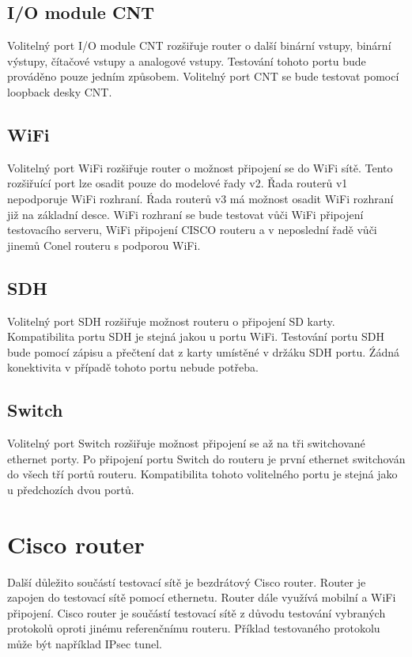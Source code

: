 \subsection{I/O module CNT}
Volitelný port I/O module CNT rozšiřuje router o další binární vstupy, binární výstupy, čítačové vstupy a analogové vstupy. Testování tohoto portu bude prováděno pouze jedním způsobem. Volitelný port CNT se bude testovat pomocí loopback desky CNT.

\subsection{WiFi}
Volitelný port WiFi rozšiřuje router o možnost připojení se do WiFi sítě. Tento rozšiřuící port lze osadit pouze do modelové řady v2. Řada routerů v1 nepodporuje WiFi rozhraní. Ŕada routerů v3 má možnost osadit WiFi rozhraní již na základní desce. WiFi rozhraní se bude testovat vůči WiFi připojení testovacího serveru, WiFi připojení CISCO routeru a v neposlední řadě vůči jinemů Conel routeru s podporou WiFi.

\subsection{SDH}
Volitelný port SDH rozšiřuje možnost routeru o připojení SD karty. Kompatibilita portu SDH je stejná jakou u portu WiFi. Testování portu SDH bude pomocí zápisu a přečtení dat z karty umístěné v držáku SDH portu. Źádná konektivita v případě tohoto portu nebude potřeba.

\subsection{Switch}
Volitelný port Switch rozšiřuje možnost připojení se až na tři switchované ethernet porty. Po připojení portu Switch do routeru je první ethernet switchován do všech tří portů routeru. Kompatibilita tohoto volitelného portu je stejná jako u předchozích dvou portů.

\section{Cisco router}
Další důležito součástí testovací sítě je bezdrátový Cisco router. Router je zapojen do testovací sítě pomocí ethernetu. Router dále využívá mobilní a WiFi připojení. Cisco router je součástí testovací sítě z důvodu testování vybraných protokolů oproti jinému referenčnímu routeru. Příklad testovaného protokolu může být například IPsec tunel.

